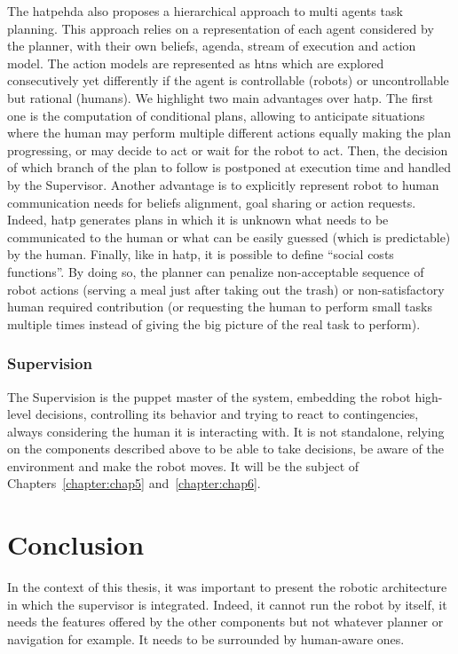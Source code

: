 \documentclass[a4paper,11pt,twoside]{StyleThese}
\begin{document}
The \acrfull{hatpehda} also proposes a hierarchical approach to multi agents task planning. This approach relies on a representation of each agent considered by the planner, with their own beliefs, agenda, stream of execution and action model. The action models are represented as \acrshort{htn}s which are explored consecutively yet differently if the agent is controllable (robots) or uncontrollable but rational (humans). We highlight two main advantages over \acrshort{hatp}. The first one is the computation of conditional plans, allowing to anticipate situations where the human may perform multiple different actions equally making the plan progressing, or may decide to act or wait for the robot to act. Then, the decision of which branch of the plan to follow is postponed at execution time and handled by the Supervisor. Another advantage is to explicitly represent robot to human communication needs for beliefs alignment, goal sharing or action requests. Indeed, \acrshort{hatp} generates plans in which it is unknown what needs to be communicated to the human or what can be easily guessed (\ie which is predictable) by the human. Finally, like in \acrshort{hatp}, it is possible to define ``social costs functions''. By doing so, the planner can penalize non-acceptable sequence of robot actions (\eg serving a meal just after taking out the trash) or non-satisfactory human required contribution (\eg or requesting the human to perform small tasks multiple times instead of giving the big picture of the real task to perform).


\subsubsection{Supervision}
The Supervision is the puppet master of the system, embedding the robot high-level decisions, controlling its behavior and trying to react to contingencies, always considering the human it is interacting with. It is not standalone, relying on the components described above to be able to take decisions, be aware of the environment and make the robot moves. It will be the subject of Chapters~\ref{chapter:chap5} and~\ref{chapter:chap6}.

\newpage

\section{Conclusion}

In the context of this thesis, it was important to present the robotic architecture in which the supervisor is integrated. Indeed, it cannot run the robot by itself, it needs the features offered by the other components but not whatever planner or navigation for example. It needs to be surrounded by human-aware ones. 
\end{document}
